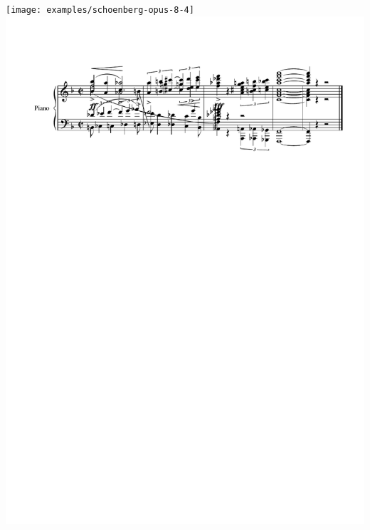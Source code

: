 \documentclass[DIV=12]{scrreprt}
\begin{document}










\texttt{[image: examples/schoenberg-opus-8-4]}
\hspace*{-2.2cm}
\includegraphics[width=19.5cm]{examples/schoenberg-opus-8-4-finale}
\end{document}
